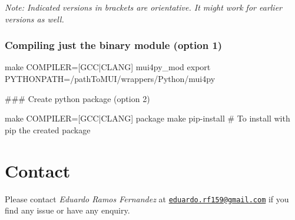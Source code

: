 {\itshape Note\+: Indicated versions in brackets are orientative. It might work for earlier versions as well.}

\subsubsection*{Compiling just the binary module (option 1)}


\begin{DoxyCode}
make COMPILER=[GCC|CLANG] mui4py\_mod
export PYTHONPATH=/pathToMUI/wrappers/Python/mui4py
\end{DoxyCode}


\#\#\# Create python package (option 2) 
\begin{DoxyCode}
make COMPILER=[GCC|CLANG] package
make pip-install # To install with pip the created package
\end{DoxyCode}
 \section*{Contact}

Please contact {\itshape Eduardo Ramos Fernandez} at \href{mailto:eduardo.rf159@gmail.com}{\tt eduardo.\+rf159@gmail.\+com} if you find any issue or have any enquiry. 